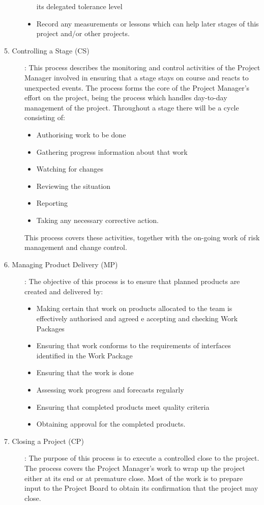 \begin{minipage}[t]{0.5\linewidth}
\begin{description}
\begin{itemize}
  its delegated tolerance level
\item Record any measurements or lessons which can help later stages of this
  project and/or other projects.
\end{itemize}
\ifslides
\newpage
\fi
\item [5. Controlling a Stage (CS)]:
This process describes the monitoring and control activities of the Project
Manager involved in ensuring that a stage stays on course and reacts to
unexpected events. The process forms the core of the Project Manager's effort
on the project, being the process which handles day-to-day management of the
project. Throughout a stage there will be a cycle consisting of:
\begin{itemize}
\item Authorising work to be done
\item Gathering progress information about that work
\item Watching for changes
\item Reviewing the situation
\item Reporting
\item Taking any necessary corrective action.
\end{itemize}
This process covers these activities, together with the on-going work of risk
management and change control.
\ifslides
\newpage
\fi
\item [6. Managing Product Delivery (MP)]:
The objective of this process is to ensure that planned products are created
and delivered by:
\begin{itemize}
\item Making certain that work on products allocated to the team is
  effectively authorised and agreed e accepting and checking Work Packages
\item Ensuring that work conforms to the requirements of interfaces identified
  in the Work Package
\item Ensuring that the work is done
\item Assessing work progress and forecasts regularly
\item Ensuring that completed products meet quality criteria
\item Obtaining approval for the completed products.
\end{itemize}
\ifslides
\newpage
\fi
\item [7. Closing a Project (CP)]:
The purpose of this process is to execute a controlled close to the
project. The process covers the Project Manager's work to wrap up the project
either at its end or at premature close. Most of the work is to prepare input
to the Project Board to obtain its confirmation that the project may close.


\end{description}
\end{minipage}
